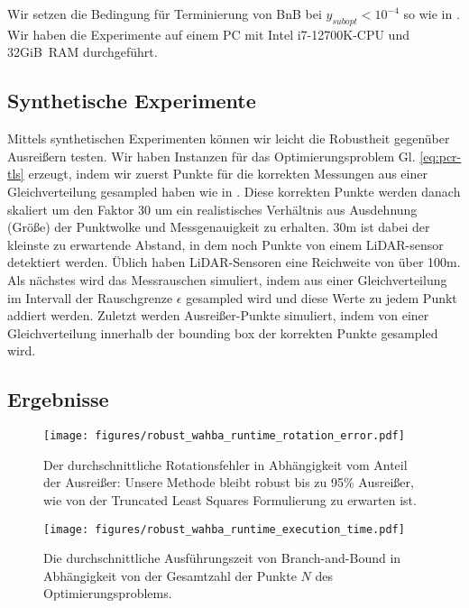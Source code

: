 Wir setzen die Bedingung für Terminierung von BnB bei $y_{subopt} < 10^{-4}$ so wie in \cite{Misener2013}.
Wir haben die Experimente auf einem PC mit Intel i7-12700K-CPU und 32GiB~RAM durchgeführt.   
\subsection{Synthetische Experimente}

Mittels synthetischen Experimenten können wir leicht die Robustheit gegenüber Ausreißern testen. 
Wir haben Instanzen für das Optimierungsproblem Gl. \ref{eq:pcr-tls} erzeugt, indem wir zuerst Punkte für die korrekten Messungen aus einer Gleichverteilung gesampled haben wie in \cite{Yang20tro-teaser}. Diese korrekten Punkte werden danach skaliert um den Faktor $30$ um ein realistisches Verhältnis aus Ausdehnung (Größe) der Punktwolke und Messgenauigkeit zu erhalten. 30m ist dabei der kleinste zu erwartende Abstand, in dem noch Punkte von einem LiDAR-sensor detektiert werden. Üblich haben LiDAR-Sensoren eine Reichweite von über 100m. 
Als nächstes wird das Messrauschen simuliert, indem aus einer Gleichverteilung im Intervall der Rauschgrenze $\epsilon$ gesampled wird und diese Werte zu jedem Punkt addiert werden. Zuletzt werden Ausreißer-Punkte simuliert, indem von einer Gleichverteilung innerhalb der bounding box der korrekten Punkte gesampled wird. 

\subsection{Ergebnisse}

\begin{figure}[!ht]
	\centering
	\begin{adjustbox}{width=1.\linewidth}
		\texttt{[image: figures/robust\_wahba\_runtime\_rotation\_error.pdf]}
		\end{adjustbox}
		\caption{Der durchschnittliche Rotationsfehler in Abhängigkeit vom Anteil der Ausreißer: Unsere Methode bleibt robust bis zu 95\% Ausreißer, wie von der Truncated Least Squares Formulierung zu erwarten ist.}
		\label{fig:rotation-error-over-outlier-rate}
\end{figure}


\begin{figure}[!ht]
	\centering
	\begin{adjustbox}{width=1.\linewidth}
		\texttt{[image: figures/robust\_wahba\_runtime\_execution\_time.pdf]}
	\end{adjustbox}
	\caption{Die durchschnittliche Ausführungszeit von Branch-and-Bound in Abhängigkeit von der Gesamtzahl der Punkte $N$ des Optimierungsproblems.}
	\label{fig:runtime}
\end{figure}

